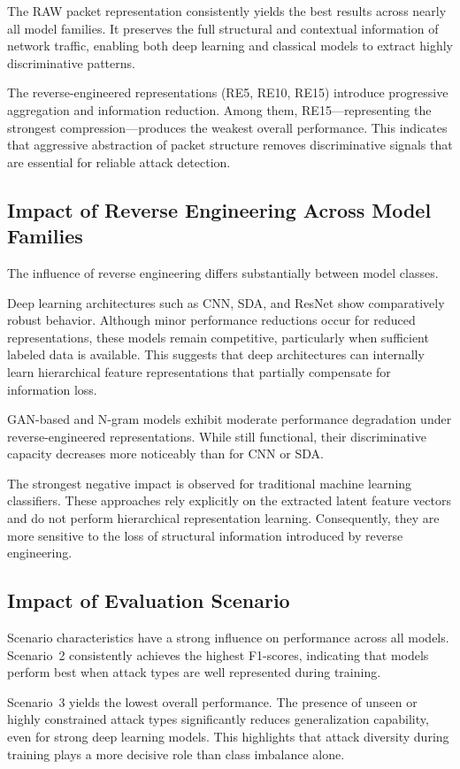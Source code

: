 The RAW packet representation consistently yields the best results
across nearly all model families.
It preserves the full structural and contextual information of
network traffic, enabling both deep learning and classical models
to extract highly discriminative patterns.

The reverse-engineered representations (RE5, RE10, RE15) introduce
progressive aggregation and information reduction.
Among them, RE15—representing the strongest compression—produces
the weakest overall performance.
This indicates that aggressive abstraction of packet structure
removes discriminative signals that are essential for reliable
attack detection.

\subsection{Impact of Reverse Engineering Across Model Families}

The influence of reverse engineering differs substantially
between model classes.

Deep learning architectures such as \ac{CNN}, \ac{SDA},
and ResNet show comparatively robust behavior.
Although minor performance reductions occur for reduced
representations, these models remain competitive,
particularly when sufficient labeled data is available.
This suggests that deep architectures can internally learn
hierarchical feature representations that partially compensate
for information loss.

GAN-based and N-gram models exhibit moderate performance
degradation under reverse-engineered representations.
While still functional, their discriminative capacity decreases
more noticeably than for \ac{CNN} or \ac{SDA}.

The strongest negative impact is observed for traditional
machine learning classifiers.
These approaches rely explicitly on the extracted latent feature
vectors and do not perform hierarchical representation learning.
Consequently, they are more sensitive to the loss of structural
information introduced by reverse engineering.

\subsection{Impact of Evaluation Scenario}

Scenario characteristics have a strong influence on performance
across all models.
Scenario~2 consistently achieves the highest F1-scores,
indicating that models perform best when attack types are well
represented during training.

Scenario~3 yields the lowest overall performance.
The presence of unseen or highly constrained attack types
significantly reduces generalization capability, even for
strong deep learning models.
This highlights that attack diversity during training plays a
more decisive role than class imbalance alone.


